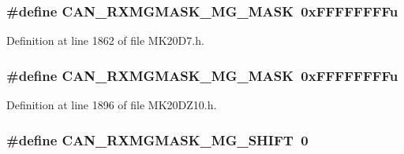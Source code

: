 \subsubsection[{\texorpdfstring{C\+A\+N\+\_\+\+R\+X\+M\+G\+M\+A\+S\+K\+\_\+\+M\+G\+\_\+\+M\+A\+SK}{CAN_RXMGMASK_MG_MASK}}]{\setlength{\rightskip}{0pt plus 5cm}\#define C\+A\+N\+\_\+\+R\+X\+M\+G\+M\+A\+S\+K\+\_\+\+M\+G\+\_\+\+M\+A\+SK~0x\+F\+F\+F\+F\+F\+F\+F\+Fu}\hypertarget{group___c_a_n___register___masks_ga2d7a5f68a7047b3c535a554cc113ef4b}{}\label{group___c_a_n___register___masks_ga2d7a5f68a7047b3c535a554cc113ef4b}


Definition at line 1862 of file M\+K20\+D7.\+h.

\subsubsection[{\texorpdfstring{C\+A\+N\+\_\+\+R\+X\+M\+G\+M\+A\+S\+K\+\_\+\+M\+G\+\_\+\+M\+A\+SK}{CAN_RXMGMASK_MG_MASK}}]{\setlength{\rightskip}{0pt plus 5cm}\#define C\+A\+N\+\_\+\+R\+X\+M\+G\+M\+A\+S\+K\+\_\+\+M\+G\+\_\+\+M\+A\+SK~0x\+F\+F\+F\+F\+F\+F\+F\+Fu}\hypertarget{group___c_a_n___register___masks_ga2d7a5f68a7047b3c535a554cc113ef4b}{}\label{group___c_a_n___register___masks_ga2d7a5f68a7047b3c535a554cc113ef4b}


Definition at line 1896 of file M\+K20\+D\+Z10.\+h.

\subsubsection[{\texorpdfstring{C\+A\+N\+\_\+\+R\+X\+M\+G\+M\+A\+S\+K\+\_\+\+M\+G\+\_\+\+S\+H\+I\+FT}{CAN_RXMGMASK_MG_SHIFT}}]{\setlength{\rightskip}{0pt plus 5cm}\#define C\+A\+N\+\_\+\+R\+X\+M\+G\+M\+A\+S\+K\+\_\+\+M\+G\+\_\+\+S\+H\+I\+FT~0}\hypertarget{group___c_a_n___register___masks_ga1ace67c70d9f25a27ca39ce78cb0034d}{}\label{group___c_a_n___register___masks_ga1ace67c70d9f25a27ca39ce78cb0034d}


